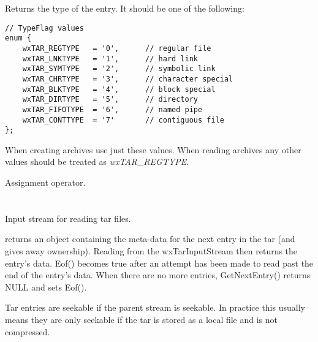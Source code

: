 \label{wxtarentrytypeflag}



Returns the type of the entry. It should be one of the following:

\begin{verbatim}
// TypeFlag values
enum {
    wxTAR_REGTYPE   = '0',      // regular file
    wxTAR_LNKTYPE   = '1',      // hard link
    wxTAR_SYMTYPE   = '2',      // symbolic link
    wxTAR_CHRTYPE   = '3',      // character special
    wxTAR_BLKTYPE   = '4',      // block special
    wxTAR_DIRTYPE   = '5',      // directory
    wxTAR_FIFOTYPE  = '6',      // named pipe
    wxTAR_CONTTYPE  = '7'       // contiguous file
};

\end{verbatim}

When creating archives use just these values. When reading archives
any other values should be treated as {\it wxTAR\_REGTYPE}.


\label{wxtarentryoperatorassign}


Assignment operator.


%
%

\section{}\label{wxtarinputstream}

Input stream for reading tar files.

 returns an
  object containing the meta-data
for the next entry in the tar (and gives away ownership). Reading from
the wxTarInputStream then returns the entry's data. Eof() becomes true
after an attempt has been made to read past the end of the entry's data.
When there are no more entries, GetNextEntry() returns NULL and sets Eof().

Tar entries are seekable if the parent stream is seekable. In practice this
usually means they are only seekable if the tar is stored as a local file and
is not compressed.

